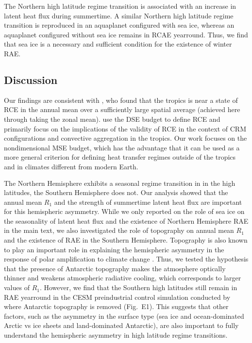 \documentclass{ametsocV5}
\begin{document}
The Northern high latitude regime transition is associated with an increase in latent heat flux during summertime. A similar Northern high latitude regime transition is reproduced in an aquaplanet configured with sea ice, whereas an aquaplanet configured without sea ice remains in RCAE yearround. Thus, we find that sea ice is a necessary and sufficient condition for the existence of winter RAE.

\subsection{Discussion}
Our findings are consistent with \cite{jakob2019}, who found that the tropics is near a state of RCE in the annual mean over a sufficiently large spatial average (achieved here through taking the zonal mean). \cite{jakob2019} use the DSE budget to define RCE and primarily focus on the implications of the validity of RCE in the context of CRM configurations and convective aggregation in the tropics. Our work focuses on the nondimensional MSE budget, which has the advantage that it can be used as a more general criterion for defining heat transfer regimes outside of the tropics and in climates different from modern Earth.

The Northern Hemisphere exhibits a seasonal regime transition in in the high latitudes, the Southern Hemisphere does not. Our analysis showed that the annual mean $R_1$ and the strength of summertime latent heat flux are important for this hemispheric asymmetry. While we only reported on the role of sea ice on the seasonality of latent heat flux and the existence of Northern Hemisphere RAE in the main text, we also investigated the role of topography on annual mean $R_1$ and the existence of RAE in the Southern Hemisphere. Topography is also known to play an important role in explaining the hemispheric asymmetry in the response of polar amplification to climate change \citep{salzmann2017,hahn2020,singh2020}. Thus, we tested the hypothesis that the presence of Antarctic topography makes the atmosphere optically thinner and weakens atmospheric radiative cooling, which corresponds to larger values of $R_1$. However, we find that the Southern high latitudes still remain in RAE yearround in the CESM preindustrial control simulation conducted by \cite{hahn2020} where Antarctic topography is removed (Fig.~E1). This suggests that other factors, such as the asymmetry in the surface type (sea ice and ocean-dominated Arctic vs ice sheets and land-dominated Antarctic), are also important to fully understand the hemispheric asymmetry in high latitude regime transitions.
\end{document}
